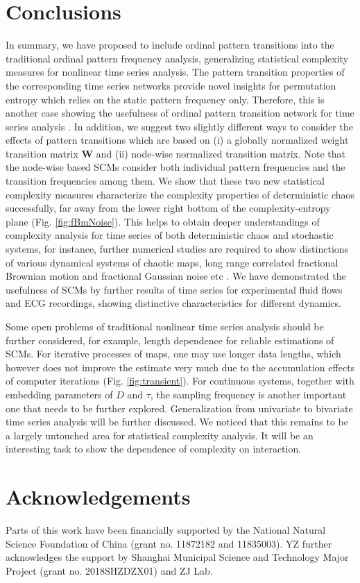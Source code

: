 \documentclass[12pt,aip,cha,reprint,nofootinbib]{revtex4-1}
\begin{document}
\section{Conclusions} \label{sec:con}
In summary, we have proposed to include ordinal pattern transitions into the traditional ordinal pattern frequency analysis, generalizing statistical complexity measures for nonlinear time series analysis. The pattern transition properties of the corresponding time series networks provide novel insights for permutation entropy which relies on the static pattern frequency only. Therefore, this is another case showing the usefulness of ordinal pattern transition network for time series analysis \cite{ZouPR2018}. In addition, we suggest two slightly different ways to consider the effects of pattern transitions which are based on (i) a globally normalized weight transition matrix $\mathbf{W}$ and (ii) node-wise normalized transition matrix. Note that the node-wise based SCMs consider both individual pattern frequencies and the transition frequencies among them. We show that these two new statistical complexity measures characterize the complexity properties of deterministic chaos successfully, far away from the lower right bottom of the complexity-entropy plane (Fig. \ref{fig:fBmNoise}). This helps to obtain deeper understandings of complexity analysis for time series of both deterministic chaos and stochastic systems, for instance, further numerical studies are required to show distinctions of various dynamical systems of chaotic maps, long range correlated fractional Brownian motion and fractional Gaussian noise etc \cite{BorgesAMC2019,RossoPRE2007}. We have demonstrated the usefulness of SCMs by further results of time series for experimental fluid flows and ECG recordings, showing distinctive characteristics for different dynamics. 

Some open problems of traditional nonlinear time series analysis should be further considered, for example, length dependence for reliable estimations of SCMs. For iterative processes of maps, one may use longer data lengths, which however does not improve the estimate very much due to the accumulation effects of computer iterations (Fig. \ref{fig:transient}). For continuous systems, together with embedding parameters of $D$ and $\tau$, the sampling frequency is another important one that needs to be further explored. Generalization from univariate to bivariate time series analysis will be further discussed. We noticed that this remains to be a largely untouched area for statistical complexity analysis. It will be an interesting task to show the dependence of complexity on interaction. 

\section*{Acknowledgements}
Parts of this work have been financially supported by the National Natural Science Foundation of China (grant no. 11872182 and 11835003). YZ further acknowledges the support by Shanghai Municipal Science and Technology Major Project (grant no. 2018SHZDZX01) and ZJ Lab. 



\end{document}
